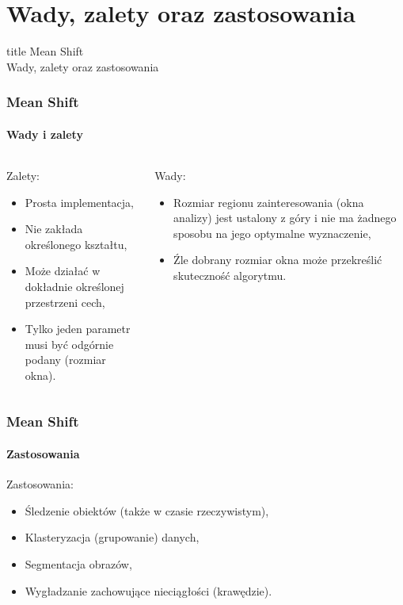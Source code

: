 \documentclass{beamer}
\begin{document}
	\section{Wady, zalety oraz zastosowania}
	\begin{frame}
		\begin{beamercolorbox}[colsep=-4bp,rounded=true,shadow=true,ht=1cm,dp=0.3cm,center]{title}
			  Mean Shift\\
			  Wady, zalety oraz zastosowania
		\end{beamercolorbox}
	\end{frame}
	
	\begin{frame}
		\frametitle{Mean Shift}
		\framesubtitle{Wady i zalety}
		\begin{columns}[T]
			\begin{column}{.5\textwidth}
				Zalety:
				\begin{itemize}
					\item Prosta implementacja,
					\item Nie zakłada określonego kształtu,
					\item Może działać w dokładnie określonej przestrzeni cech,
					\item Tylko jeden parametr musi być odgórnie podany (rozmiar okna).
				\end{itemize}
			\end{column}
			\begin{column}{.5\textwidth}
				Wady:
				\begin{itemize}
					\item Rozmiar regionu zainteresowania (okna analizy) jest ustalony z góry i nie ma żadnego sposobu na jego optymalne wyznaczenie,
					\item Źle dobrany rozmiar okna może przekreślić skuteczność algorytmu.
				\end{itemize}
			\end{column}
		\end{columns}
	\end{frame}
	
	\begin{frame}
		\frametitle{Mean Shift}
		\framesubtitle{Zastosowania}
		Zastosowania:
		\begin{itemize}
			\item Śledzenie obiektów (także w czasie rzeczywistym),
			\item Klasteryzacja (grupowanie) danych,
			\item Segmentacja obrazów,
			\item Wygładzanie zachowujące nieciągłości (krawędzie).
		\end{itemize}
	\end{frame}
\end{document}
